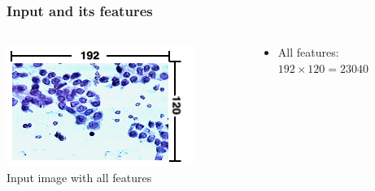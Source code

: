 \documentclass[aspectratio=1610]{beamer}
\begin{document}
\begin{frame}
  \frametitle{\hfill Input and its features}
  \begin{columns}[T]
    \begin{column}{.5\textwidth}
      \begin{block}{}
        \includegraphics[width=\textwidth]{images/FsPicHelPNG.png}\\
        Input image with all features
      \end{block}
    \end{column}
    \begin{column}{.5\textwidth}
      \begin{block}{}
        \begin{itemize}
          \item All features:\\
            $192\times120=23040$
        \end{itemize}
        \vspace{0.02\textheight}
      \end{block}
    \end{column}
  \end{columns}
\end{frame}
\end{document}

